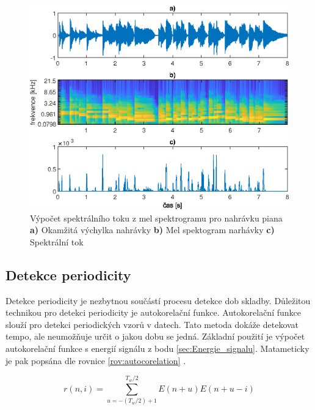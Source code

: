   \begin{figure}[H]
    \centering
    \includegraphics[width = 0.8\linewidth]{obrazky/Mel_spektralni_tok.eps}
    \caption{Výpočet spektrálního toku z mel spektrogramu pro nahrávku piana \textbf{a)} Okamžitá výchylka nahrávky \textbf{b)} Mel spektogram narhávky \textbf{c)} Spektrální tok}
    \label{fig:Mel_spectralni_tok}
  \end{figure}


  \subsection{Detekce periodicity}
    Detekce periodicity je nezbytnou součástí procesu detekce dob skladby. Důležitou technikou pro detekci periodicity je autokorelační funkce.
    Autokorelační funkce slouží pro detekci periodických vzorů v datech.
    Tato metoda dokáže detekovat tempo, ale neumožňuje určit o jakou dobu se jedná.
    Základní použití je výpočet autokorelační funkce s energií signálu z bodu \ref{sec:Energie_signalu}. Matameticky je pak popsána dle rovnice \ref{rov:autocorelation} \cite{Signal_processing_methods_for_music_transcription}.

    \begin{equation}
      r(n,i) = \sum_{u = -(T_w / 2) + 1}^{T_w / 2} E(n+u)E(n+u-i)
      \label{rov:autocorelation}
    \end{equation}

